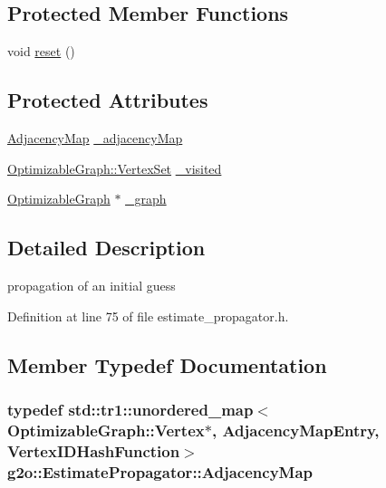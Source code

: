 \subsection*{Protected Member Functions}
\begin{DoxyCompactItemize}
\item 
void \hyperlink{classg2o_1_1EstimatePropagator_a8319099eda0552b9ef62a0bb40bb0785}{reset} ()
\end{DoxyCompactItemize}
\subsection*{Protected Attributes}
\begin{DoxyCompactItemize}
\item 
\hyperlink{classg2o_1_1EstimatePropagator_aa450038ec206c089ecf023cb88cb2847}{Adjacency\+Map} \hyperlink{classg2o_1_1EstimatePropagator_ac3f6429938db62696444fd7ee765439a}{\+\_\+adjacency\+Map}
\item 
\hyperlink{classg2o_1_1HyperGraph_a703938cdb4bb636860eed55a2489d70c}{Optimizable\+Graph\+::\+Vertex\+Set} \hyperlink{classg2o_1_1EstimatePropagator_a1256927d6d1832ee300daa53d1c845a2}{\+\_\+visited}
\item 
\hyperlink{structg2o_1_1OptimizableGraph}{Optimizable\+Graph} $\ast$ \hyperlink{classg2o_1_1EstimatePropagator_ac2dcd3169696692ce3f0679235933e8a}{\+\_\+graph}
\end{DoxyCompactItemize}


\subsection{Detailed Description}
propagation of an initial guess 

Definition at line 75 of file estimate\+\_\+propagator.\+h.



\subsection{Member Typedef Documentation}
\subsubsection[{\texorpdfstring{Adjacency\+Map}{AdjacencyMap}}]{\setlength{\rightskip}{0pt plus 5cm}typedef std\+::tr1\+::unordered\+\_\+map$<${\bf Optimizable\+Graph\+::\+Vertex}$\ast$, {\bf Adjacency\+Map\+Entry}, {\bf Vertex\+I\+D\+Hash\+Function}$>$ {\bf g2o\+::\+Estimate\+Propagator\+::\+Adjacency\+Map}}\hypertarget{classg2o_1_1EstimatePropagator_aa450038ec206c089ecf023cb88cb2847}{}\label{classg2o_1_1EstimatePropagator_aa450038ec206c089ecf023cb88cb2847}



